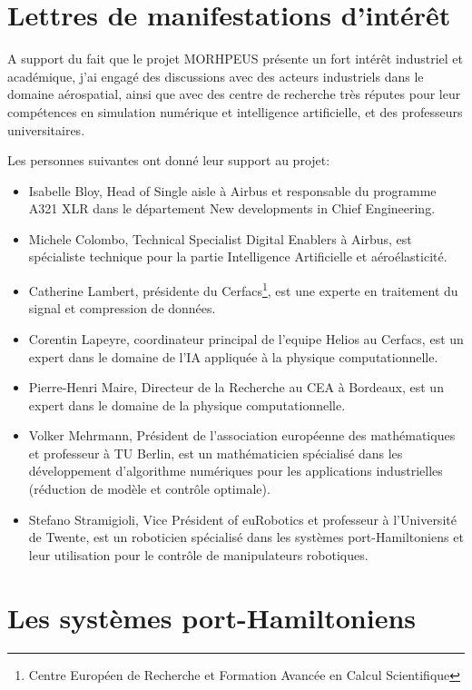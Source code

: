 \documentclass[12pt, french]{article}
\begin{document}
	\appendix
	
	\section{Lettres de manifestations d'intérêt}
	
	A support du fait que le projet MORHPEUS présente un fort intérêt industriel et académique, j'ai engagé des discussions avec des acteurs industriels dans le domaine aérospatial, ainsi que avec des centre de recherche très réputes pour leur compétences en simulation numérique et intelligence artificielle, et des professeurs universitaires. 
	
	Les personnes suivantes ont donné leur support au projet:
	\begin{itemize}
		\item Isabelle Bloy, Head of Single aisle  à Airbus et responsable du programme A321 XLR dans le département New developments in Chief Engineering.
		\item Michele Colombo, Technical Specialist Digital Enablers à Airbus, est spécialiste technique pour la partie Intelligence Artificielle et aéroélasticité.
		\item Catherine Lambert, présidente du Cerfacs\footnote{Centre Européen de Recherche et Formation Avancée en Calcul Scientifique}, est une experte en traitement du signal et compression de données. 
		\item Corentin Lapeyre, coordinateur principal de l'equipe Helios au Cerfacs, est un expert dans le domaine de l'IA appliquée à la physique computationnelle.
		\item Pierre-Henri Maire, Directeur de la Recherche au CEA à Bordeaux, est un expert dans le domaine de la physique computationnelle.
		\item Volker Mehrmann, Président de l'association européenne des mathématiques et professeur à TU Berlin, est un mathématicien spécialisé dans les développement d'algorithme numériques pour les applications industrielles (réduction de modèle et contrôle optimale).
		\item Stefano Stramigioli, Vice Président of euRobotics et professeur à l'Université de Twente, est un roboticien spécialisé dans les systèmes port-Hamiltoniens et leur utilisation pour le contrôle de manipulateurs robotiques.
	\end{itemize}




\section{Les systèmes port-Hamiltoniens}
\end{document}
